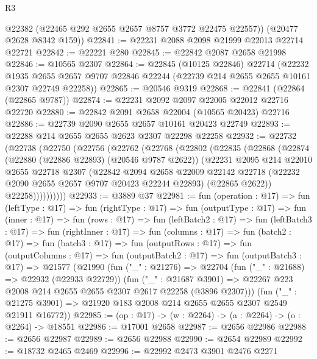 \begin{lexlean}{R3}
\begin{coremodule}
        @22382
        (@22465 @292 @2655 @2657 @8757 @3772 @22475 @22557))
      (@20477 @2628 @8342 @159))
@22841 := @22231 @2088 @2098 @21999 @22013 @22714 @22721
@22842 := @22221 @280
@22845 := @22842 @2087 @2658 @21998
@22846 := @10565 @2307
@22864 := @22845
    (@10125 @22846)
    @22714
    (@22232
      @1935
      @2655
      @2657
      @9707
      @22846
      @22244
      (@22739 @214 @2655 @2655 @10161 @2307 @22749 @22258))
@22865 := @20546 @9319
@22868 := @22841 (@22864 (@22865 @9787))
@22874 := @22231 @2092 @2097 @22005 @22012 @22716 @22720
@22880 := @22842 @2091 @2658 @22004 (@10565 @20423) @22716
@22886 := @22739 @2090 @2655 @2657 @10161 @20423 @22749
@22893 := @22288 @214 @2655 @2655 @2623 @2307 @22298 @22258
@22932 := @22732
    (@22738
      (@22750
        (@22756
          (@22762
            (@22768
              (@22802
                (@22835
                  (@22868
                    (@22874
                      (@22880 (@22886 @22893) (@20546 @9787 @2622))
                      (@22231
                        @2095
                        @214
                        @22010
                        @2655
                        @22718
                        @2307
                        (@22842
                          @2094
                          @2658
                          @22009
                          @22142
                          @22718
                          (@22232 @2090 @2655 @2657 @9707 @20423 @22244 @22893)
                          (@22865 @2622))
                        @22258))))))))))
@22933 := @3889 @37
@22981 := fun (operation : @17) =>
  fun (leftType : @17) =>
  fun (rightType : @17) =>
  fun (outputType : @17) =>
  fun (inner : @17) =>
  fun (rows : @17) =>
  fun (leftBatch2 : @17) =>
  fun (leftBatch3 : @17) =>
  fun (rightInner : @17) =>
  fun (columns : @17) =>
  fun (batch2 : @17) =>
  fun (batch3 : @17) =>
  fun (outputRows : @17) =>
  fun (outputColumns : @17) =>
  fun (outputBatch2 : @17) =>
  fun (outputBatch3 : @17) =>
  @21577
    (@21990
      (fun ("_" : @21276) =>
      @22704
        (fun ("_" : @21688) => @22932 (@22933 @22729))
        (fun ("_" : @21687 @3901) =>
        @22267 @223 @2008 @214 @2655 @2655 @2307 @2617 @22258 (@3896 @2307)))
      (fun ("_" : @21275 @3901) => @21920 @183 @2008 @214 @2655 @2655 @2307 @2549 @21911 @16772))
@22985 := (op : @17) -> (w : @2264) -> (a : @2264) -> (o : @2264) -> @18551
@22986 := @17001 @2658
@22987 := @2656 @22986
@22988 := @2656 @22987
@22989 := @2656 @22988
@22990 := @2654 @22989
@22992 := @18732 @2465 @2469
@22996 := @22992 @2473 @3901 @2476 @2271

\end{coremodule}
\end{lexlean}
